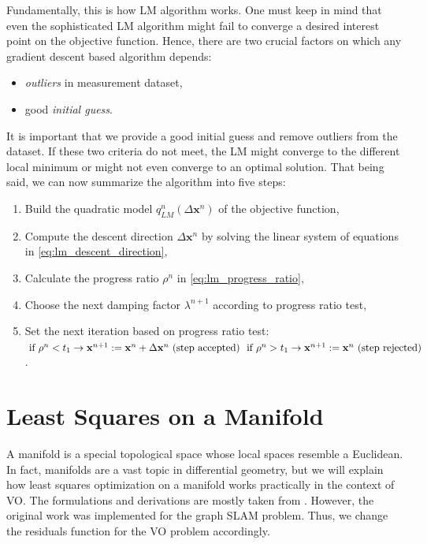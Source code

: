 \documentclass[a4paper]{report}
\numberwithin{figure}{section}
\begin{document}
\begin{appendices}
Fundamentally, this is how LM algorithm works. 
One must keep in mind that even the sophisticated LM algorithm might fail to 
converge a desired interest point on the objective function. Hence, 
there are two crucial factors on which any gradient descent based algorithm depends:
\begin{itemize}
  \item \textit{outliers} in measurement dataset,
  \item good \textit{initial guess}. 
\end{itemize}

It is important that we provide a good initial
guess and remove outliers from the dataset. 
If these two criteria do not meet, the LM might converge to the
different local minimum or might not even converge to
an optimal solution. 
That being said, we can now summarize the algorithm into five steps:

\begin{enumerate}
  \item Build the quadratic model $q_{LM}^n(\Delta \mathbf{x}^n)$ of the objective function,
  \item Compute the descent direction $\Delta \mathbf{x}^n$ by solving the linear system of 
    equations in \eqref{eq:lm_descent_direction},
  \item Calculate the progress ratio $\rho^n$ in \eqref{eq:lm_progress_ratio},
  \item Choose the next damping factor $\lambda^{n+1}$ according to progress ratio test,
  \item Set the next iteration based on progress ratio test:
    $\\ \text{  if } \rho^n < t_1 \rightarrow \mathbf{x}^{n+1}:=\mathbf{x}^n +\Delta \mathbf{x}^n \text{ (step accepted) }\\ 
    \text{  if }\rho^n > t_1 \rightarrow \mathbf{x}^{n+1}:=\mathbf{x}^n \text{ (step rejected)}$.
\end{enumerate}



\section{Least Squares on a Manifold}\label{sc_lsq_manifold}

A manifold is a special topological space whose local spaces resemble a 
Euclidean.
In fact, manifolds are a vast topic in differential geometry, but
we will explain how least squares optimization on 
a manifold works practically in the context of VO. The formulations and 
derivations are mostly taken from \parencite{Sol2016}. However, 
the original work was implemented for the graph SLAM problem. Thus, 
we change the residuals function for the VO problem accordingly. 


\end{appendices}
\end{document}
